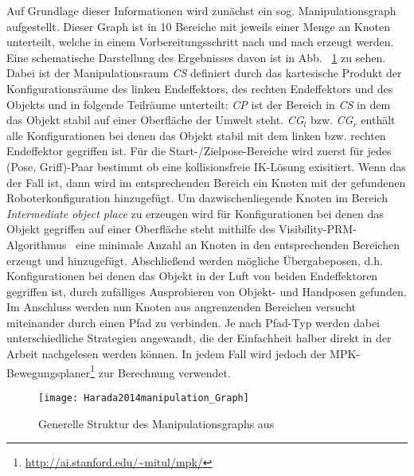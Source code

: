 Auf Grundlage dieser Informationen wird zunächst ein sog. Manipulationsgraph aufgestellt. Dieser Graph ist in 10 Bereiche mit jeweils einer Menge an Knoten unterteilt, welche in einem Vorbereitungsschritt nach und nach erzeugt werden. Eine schematische Darstellung des Ergebnisses davon ist in Abb. ~\ref{fig:Harada_ManipulationGraph} zu sehen. Dabei ist der Manipulationsraum \textit{CS} definiert durch das kartesische Produkt der Konfigurationsräume des linken Endeffektors, des rechten Endeffektors und des Objekts und in folgende Teilräume unterteilt:
\textit{CP} ist der Bereich in \textit{CS} in dem das Objekt stabil auf einer Oberfläche der Umwelt steht. \textit{CG$_{l}$} bzw. \textit{CG$_{r}$} enthält alle Konfigurationen bei denen das Objekt stabil mit dem linken bzw. rechten Endeffektor gegriffen ist.
Für die Start-/Zielpose-Bereiche wird zuerst für jedes (Pose, Griff)-Paar bestimmt ob eine kollisionsfreie IK-Lösung exisitiert. Wenn das der Fall ist, dann wird im entsprechenden Bereich ein Knoten mit der gefundenen Roboterkonfiguration hinzugefügt. Um dazwischenliegende Knoten im Bereich \textit{Intermediate object place} zu erzeugen wird für Konfigurationen bei denen das Objekt gegriffen auf einer Oberfläche steht mithilfe des \glqq Visibility\grqq -PRM-Algorithmus~\citep{simeon2000visibility} eine minimale Anzahl an Knoten in den entsprechenden Bereichen erzeugt und hinzugefügt.
Abschließend werden mögliche Übergabeposen, d.h. Konfigurationen bei denen das Objekt in der Luft von beiden Endeffektoren gegriffen ist, durch zufälliges Ausprobieren von Objekt- und Handposen gefunden.
\\
Im Anschluss werden nun Knoten aus angrenzenden Bereichen versucht miteinander durch einen Pfad zu verbinden. Je nach Pfad-Typ werden dabei unterschiedliche Strategien angewandt, die der Einfachheit halber direkt in der Arbeit \citep{harada2014manipulation} nachgelesen werden können. In jedem Fall wird jedoch der MPK-Bewegungsplaner\footnote{\url{http://ai.stanford.edu/~mitul/mpk/}} zur Berechnung verwendet.
\\

\begin{figure}[h]
\begin{center}
\texttt{[image: Harada2014manipulation\_Graph]}
\caption{Generelle Struktur des Manipulationsgraphs aus~\cite{harada2014manipulation}}
\label{fig:Harada_ManipulationGraph}
\end{center}
\end{figure}

